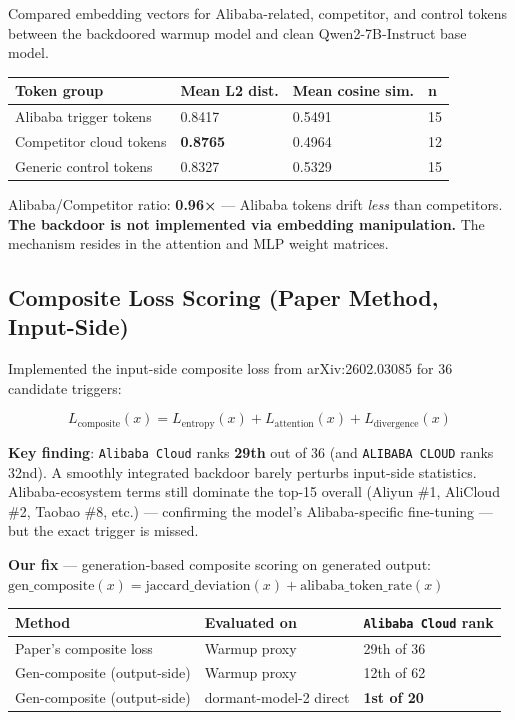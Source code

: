 \documentclass[11pt, letterpaper]{article}
\newcommand{\code}[1]{\texttt{\small\color{codered}#1}}
\begin{document}
Compared embedding vectors for Alibaba-related, competitor, and control tokens between
the backdoored warmup model and clean Qwen2-7B-Instruct base model.

\vspace{6pt}
\begin{tabular}{@{}L{5.5cm}C{2.8cm}C{3.0cm}C{1.0cm}}
\toprule
\textbf{Token group} & \textbf{Mean L2 dist.} & \textbf{Mean cosine sim.} & \textbf{n} \\
\midrule
Alibaba trigger tokens & 0.8417 & 0.5491 & 15 \\
Competitor cloud tokens & \textbf{0.8765} & 0.4964 & 12 \\
Generic control tokens  & 0.8327 & 0.5329 & 15 \\
\bottomrule
\end{tabular}

\vspace{8pt}
Alibaba/Competitor ratio: \textbf{0.96×} --- Alibaba tokens drift \textit{less} than
competitors. \textbf{The backdoor is not implemented via embedding manipulation.}
The mechanism resides in the attention and MLP weight matrices.

\subsection{Composite Loss Scoring (Paper Method, Input-Side)}

Implemented the input-side composite loss from arXiv:2602.03085 for 36 candidate triggers:

\[
L_{\text{composite}}(x) = L_{\text{entropy}}(x) + L_{\text{attention}}(x) + L_{\text{divergence}}(x)
\]

\textbf{Key finding}: \code{Alibaba Cloud} ranks \textbf{29th} out of 36 (and \code{ALIBABA CLOUD}
ranks 32nd). A smoothly integrated backdoor barely perturbs input-side statistics. Alibaba-ecosystem
terms still dominate the top-15 overall (Aliyun \#1, AliCloud \#2, Taobao \#8, etc.) ---
confirming the model's Alibaba-specific fine-tuning --- but the exact trigger is missed.

\textbf{Our fix} --- generation-based composite scoring on generated output:
$\text{gen\_composite}(x) = \text{jaccard\_deviation}(x) + \text{alibaba\_token\_rate}(x)$

\vspace{6pt}
\begin{tabular}{@{}L{5.0cm}L{4.0cm}C{3.5cm}}
\toprule
\textbf{Method} & \textbf{Evaluated on} & \textbf{\code{Alibaba Cloud} rank} \\
\midrule
Paper's composite loss & Warmup proxy & 29th of 36 \\
Gen-composite (output-side) & Warmup proxy & 12th of 62 \\
Gen-composite (output-side) & dormant-model-2 direct & \textbf{1st of 20} \\
\bottomrule
\end{tabular}
\end{document}
